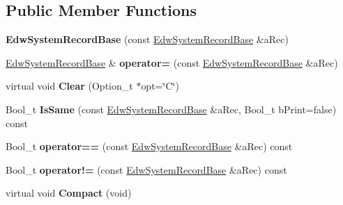 \subsection*{Public Member Functions}
\begin{DoxyCompactItemize}
\item 
\hypertarget{class_edw_system_record_base_aa493727e16edd7d8ca1e0baed405fe40}{
{\bfseries EdwSystemRecordBase} (const \hyperlink{class_edw_system_record_base}{EdwSystemRecordBase} \&aRec)}
\label{class_edw_system_record_base_aa493727e16edd7d8ca1e0baed405fe40}

\item 
\hypertarget{class_edw_system_record_base_a7d59c75633c16dfe333801f9bffa04e8}{
\hyperlink{class_edw_system_record_base}{EdwSystemRecordBase} \& {\bfseries operator=} (const \hyperlink{class_edw_system_record_base}{EdwSystemRecordBase} \&aRec)}
\label{class_edw_system_record_base_a7d59c75633c16dfe333801f9bffa04e8}

\item 
\hypertarget{class_edw_system_record_base_a75d03bf346c210b92eec0eac6338fb48}{
virtual void {\bfseries Clear} (Option\_\-t $\ast$opt=\char`\"{}C\char`\"{})}
\label{class_edw_system_record_base_a75d03bf346c210b92eec0eac6338fb48}

\item 
\hypertarget{class_edw_system_record_base_a2b21a770a0edab5823c33eee85728300}{
Bool\_\-t {\bfseries IsSame} (const \hyperlink{class_edw_system_record_base}{EdwSystemRecordBase} \&aRec, Bool\_\-t bPrint=false) const }
\label{class_edw_system_record_base_a2b21a770a0edab5823c33eee85728300}

\item 
\hypertarget{class_edw_system_record_base_aeaac8f18e8393d7f49e629e809ceedf5}{
Bool\_\-t {\bfseries operator==} (const \hyperlink{class_edw_system_record_base}{EdwSystemRecordBase} \&aRec) const }
\label{class_edw_system_record_base_aeaac8f18e8393d7f49e629e809ceedf5}

\item 
\hypertarget{class_edw_system_record_base_a75ef08215dfde3459a0850acbb4d1eb1}{
Bool\_\-t {\bfseries operator!=} (const \hyperlink{class_edw_system_record_base}{EdwSystemRecordBase} \&aRec) const }
\label{class_edw_system_record_base_a75ef08215dfde3459a0850acbb4d1eb1}

\item 
\hypertarget{class_edw_system_record_base_a9058ecab194728d8f60c4ba431813084}{
virtual void {\bfseries Compact} (void)}
\label{class_edw_system_record_base_a9058ecab194728d8f60c4ba431813084}


\end{DoxyCompactItemize}
